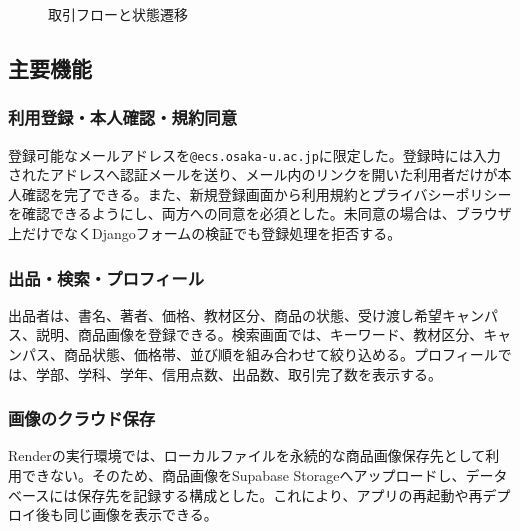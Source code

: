 \documentclass[11pt,a4paper]{article}
\begin{document}
\begin{figure}[H]
  \centering
  \caption{取引フローと状態遷移}
\end{figure}

\subsection{主要機能}

\subsubsection{利用登録・本人確認・規約同意}

登録可能なメールアドレスを\texttt{@ecs.osaka-u.ac.jp}に限定した。登録時には入力されたアドレスへ認証メールを送り、メール内のリンクを開いた利用者だけが本人確認を完了できる。また、新規登録画面から利用規約とプライバシーポリシーを確認できるようにし、両方への同意を必須とした。未同意の場合は、ブラウザ上だけでなくDjangoフォームの検証でも登録処理を拒否する。

\subsubsection{出品・検索・プロフィール}

出品者は、書名、著者、価格、教材区分、商品の状態、受け渡し希望キャンパス、説明、商品画像を登録できる。検索画面では、キーワード、教材区分、キャンパス、商品状態、価格帯、並び順を組み合わせて絞り込める。プロフィールでは、学部、学科、学年、信用点数、出品数、取引完了数を表示する。

\subsubsection{画像のクラウド保存}

Renderの実行環境では、ローカルファイルを永続的な商品画像保存先として利用できない。そのため、商品画像をSupabase Storageへアップロードし、データベースには保存先を記録する構成とした。これにより、アプリの再起動や再デプロイ後も同じ画像を表示できる。
\end{document}
